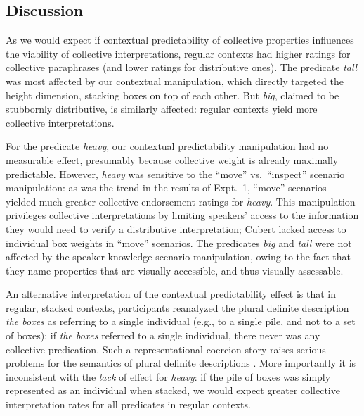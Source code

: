 \documentclass[preprint,12pt,authoryear,titlepage]{elsarticle}
\begin{document}
\subsection{Discussion}

As we would expect if contextual predictability of collective properties influences the viability of collective interpretations, regular contexts had higher ratings for collective paraphrases (and lower ratings for distributive ones). The predicate \textit{tall} was most affected by our contextual manipulation, which directly targeted the height dimension, stacking boxes on top of each other. But \emph{big}, claimed to be stubbornly distributive, is similarly affected: regular contexts yield more collective interpretations. 

For the predicate \emph{heavy}, our contextual predictability manipulation had no measurable effect, presumably because collective weight is already maximally predictable. However, \emph{heavy} was sensitive to the ``move'' vs.~``inspect'' scenario manipulation: as was the trend in the results of Expt.~1, ``move'' scenarios yielded much greater collective endorsement ratings for \emph{heavy}. This manipulation privileges collective interpretations by limiting speakers' access to the information they would need to verify a distributive interpretation; Cubert lacked access to individual box weights in ``move'' scenarios. The predicates \emph{big} and \emph{tall} were not affected by the speaker knowledge scenario manipulation, owing to the fact that they name properties that are visually accessible, and thus visually assessable.

An alternative interpretation of the contextual predictability effect is that in regular, stacked contexts, participants reanalyzed the plural definite description \emph{the boxes} as referring to a single individual (e.g., to a single pile, and not to a set of boxes); if \emph{the boxes} referred to a single individual, there never was any collective predication.
Such a representational coercion story raises serious problems for the semantics of plural definite descriptions \citep[for discussion, see ][]{link1983,landman1989,schwarzschild1996,link1998}. More importantly it is inconsistent with the \emph{lack} of effect for \emph{heavy}: if the pile of boxes was simply represented as an individual when stacked, we would expect greater collective interpretation rates for all predicates in regular contexts.
\end{document}
